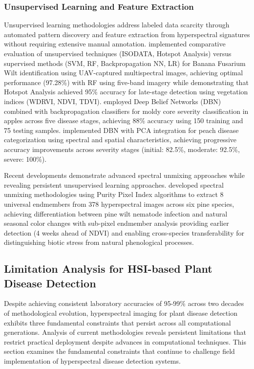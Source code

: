 \documentclass[sn-mathphys]{sn-jnl}
\theoremstyle{thmstyleone}%
\theoremstyle{thmstyletwo}%
\theoremstyle{thmstylethree}%
\begin{document}
\subsubsection{Unsupervised Learning and Feature Extraction}

Unsupervised learning methodologies address labeled data scarcity through automated pattern discovery and feature extraction from hyperspectral signatures without requiring extensive manual annotation. \citet{zhang2022banana} implemented comparative evaluation of unsupervised techniques (ISODATA, Hotspot Analysis) versus supervised methods (SVM, RF, Backpropagation NN, LR) for Banana Fusarium Wilt identification using UAV-captured multispectral images, achieving optimal performance (97.28\%) with RF using five-band imagery while demonstrating that Hotspot Analysis achieved 95\% accuracy for late-stage detection using vegetation indices (WDRVI, NDVI, TDVI). \citet{zhou2017non} employed Deep Belief Networks (DBN) combined with backpropagation classifiers for moldy core severity classification in apples across five disease stages, achieving 88\% accuracy using 150 training and 75 testing samples. \citet{sun2018classification} implemented DBN with PCA integration for peach disease categorization using spectral and spatial characteristics, achieving progressive accuracy improvements across severity stages (initial: 82.5\%, moderate: 92.5\%, severe: 100\%).

Recent developments demonstrate advanced spectral unmixing approaches while revealing persistent unsupervised learning approaches. \citet{jeong2025spectral} developed spectral unmixing methodologies using Purity Pixel Index algorithms to extract 8 universal endmembers from 378 hyperspectral images across six pine species, achieving differentiation between pine wilt nematode infection and natural seasonal color changes with sub-pixel endmember analysis providing earlier detection (4 weeks ahead of NDVI) and enabling cross-species transferability for distinguishing biotic stress from natural phenological processes.

\subsection{Limitation Analysis for HSI-based Plant Disease Detection}

Despite achieving consistent laboratory accuracies of 95-99\% across two decades of methodological evolution, hyperspectral imaging for plant disease detection exhibits three fundamental constraints that persist across all computational generations. Analysis of current methodologies reveals persistent limitations that restrict practical deployment despite advances in computational techniques. This section examines the fundamental constraints that continue to challenge field implementation of hyperspectral disease detection systems.
\end{document}

